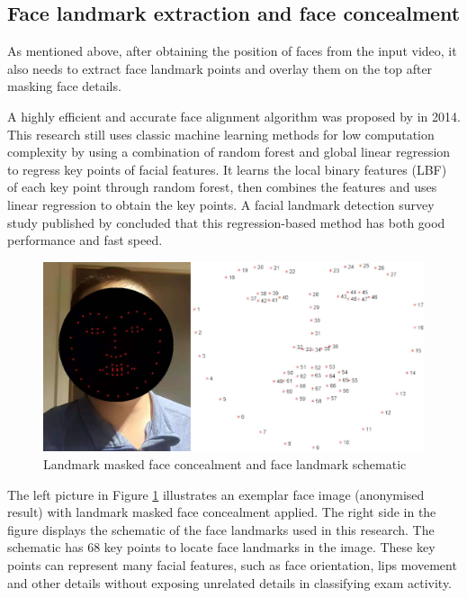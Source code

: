 \subsection{Face landmark extraction and face concealment} %
As mentioned above, after obtaining the position of faces from the input video, it also needs to extract face landmark points and overlay them on the top after masking face details.

A highly efficient and accurate face alignment algorithm was proposed by \citet{ren2014face} in 2014.
This research still uses classic machine learning methods for low computation complexity by using a combination of random forest and global linear regression to regress key points of facial features.
It learns the local binary features (LBF) of each key point through random forest, then combines the features and uses linear regression to obtain the key points.
A facial landmark detection survey study published by \citet{wu2019facial} concluded that this regression-based method has both good performance and fast speed.

\begin{figure}[!ht]
    \centering
    \includegraphics[width=\textwidth]{design/imgs/3-face-landmark.png}
    \caption{Landmark masked face concealment and face landmark schematic}
    \label{fig:3-face-landmark}
\end{figure}

The left picture in Figure \ref{fig:3-face-landmark} illustrates an exemplar face image (anonymised result) with landmark masked face concealment applied.
The right side in the figure displays the schematic of the face landmarks used in this research.
The schematic has 68 key points to locate face landmarks in the image.
These key points can represent many facial features, such as face orientation, lips movement and other details without exposing unrelated details in classifying exam activity.

